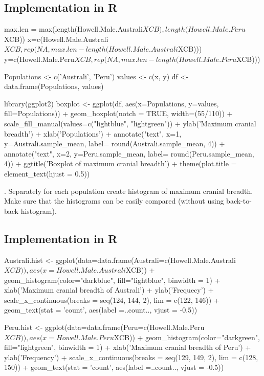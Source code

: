 \documentclass[12pt, oneside]{report}\usepackage[]{graphicx}\usepackage[]{color}
\begin{document}
\subsection*{Implementation in R}
\begin{Schunk}
\begin{Sinput}
max.len = max(length(Howell.Male.Australi$XCB), length(Howell.Male.Peru$XCB))
x=c(Howell.Male.Australi$XCB, rep(NA, max.len - length(Howell.Male.Australi$XCB)))
y=c(Howell.Male.Peru$XCB, rep(NA, max.len - length(Howell.Male.Peru$XCB)))

Populations <- c('Australi', 'Peru')
values <- c(x, y)
df <- data.frame(Populations, values)

library(ggplot2)
boxplot <- ggplot(df, aes(x=Populations, y=values, fill=Populations)) +
          geom_boxplot(notch = TRUE, width=(55/110)) +
          scale_fill_manual(values=c("lightblue", "lightgreen")) +
          ylab('Maximum cranial breadth') +
          xlab('Populations') +
          annotate("text", x=1, y=Australi.sample_mean, 
                   label= round(Australi.sample_mean, 4)) +
          annotate("text", x=2, y=Peru.sample_mean, 
                   label= round(Peru.sample_mean, 4)) +
          ggtitle('Boxplot of maximum cranial breadth') +
          theme(plot.title = element_text(hjust = 0.5))
\end{Sinput}
\end{Schunk}

. Separately for each population create histogram of maximum cranial breadth. Make sure that the histograms can be easily compared (without using back-to-back histogram).
\subsection*{Implementation in R}
\begin{Schunk}
\begin{Sinput}
Australi.hist <- ggplot(data=data.frame(Australi=c(Howell.Male.Australi$XCB)), 
                        aes(x=Howell.Male.Australi$XCB)) + 
                geom_histogram(color="darkblue", fill="lightblue", binwidth = 1) + 
                xlab('Maximum cranial breadth of Australi') +
                ylab('Frequecy') +
                scale_x_continuous(breaks = seq(124, 144, 2), lim = c(122, 146)) + 
                geom_text(stat = 'count', aes(label =..count.., vjust = -0.5))

Peru.hist <- ggplot(data=data.frame(Peru=c(Howell.Male.Peru$XCB)), 
                    aes(x=Howell.Male.Peru$XCB)) + 
            geom_histogram(color="darkgreen", fill="lightgreen", binwidth = 1) + 
            xlab('Maximum cranial breadth of Peru') + 
            ylab('Frequency') +
            scale_x_continuous(breaks = seq(129, 149, 2), lim = c(128, 150)) + 
            geom_text(stat = 'count', aes(label =..count.., vjust = -0.5))
\end{Sinput}
\end{Schunk}
\end{document}
